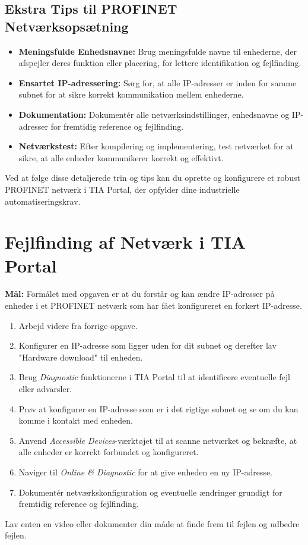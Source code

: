 \subsection*{Ekstra Tips til PROFINET Netværksopsætning}
\begin{itemize}
	\item \textbf{Meningsfulde Enhedsnavne:} Brug meningsfulde navne til enhederne, der afspejler deres funktion eller placering, for lettere identifikation og fejlfinding.
	\item \textbf{Ensartet IP-adressering:} Sørg for, at alle IP-adresser er inden for samme subnet for at sikre korrekt kommunikation mellem enhederne.
	\item \textbf{Dokumentation:} Dokumentér alle netværksindstillinger, enhedsnavne og IP-adresser for fremtidig reference og fejlfinding.
	\item \textbf{Netværkstest:} Efter kompilering og implementering, test netværket for at sikre, at alle enheder kommunikerer korrekt og effektivt.
\end{itemize}
Ved at følge disse detaljerede trin og tips kan du oprette og konfigurere et robust PROFINET netværk i TIA Portal, der opfylder dine industrielle automatiseringskrav.

\section{Fejlfinding af Netværk i TIA Portal}
\textbf{Mål:} Formålet med opgaven er at du forstår og kan ændre IP-adresser på enheder i et PROFINET netværk som har fået konfigureret en forkert IP-adresse.
\begin{enumerate}
	\item Arbejd videre fra forrige opgave.
	\item Konfigurer en IP-adresse som ligger uden for dit subnet og derefter lav "Hardware download" til enheden.
	\item Brug \textit{Diagnostic} funktionerne i TIA Portal til at identificere eventuelle fejl eller advarsler.
	\item Prøv at konfigurer en IP-adresse som er i det rigtige subnet og se om du kan komme i kontakt med enheden.
	\item Anvend \textit{Accessible Devices}-værktøjet til at scanne netværket og bekræfte, at alle enheder er korrekt forbundet og konfigureret.
	\item Naviger til \textit{Online \& Diagnostic} for at give enheden en ny IP-adresse. 
	\item Dokumentér netværkskonfiguration og eventuelle ændringer grundigt for fremtidig reference og fejlfinding.
\end{enumerate}
Lav enten en video eller dokumenter din måde at finde frem til fejlen og udbedre fejlen.

